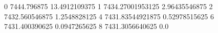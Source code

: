 0 7444.796875 13.4912109375
1 7434.27001953125 2.96435546875
2 7432.560546875 1.2548828125
4 7431.83544921875 0.52978515625
6 7431.400390625 0.0947265625
8 7431.3056640625 0.0
